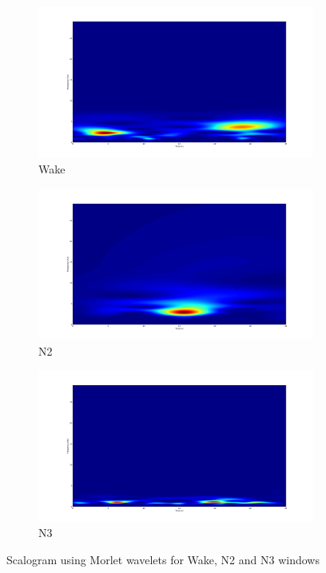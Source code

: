 \documentclass[12pt]{report}
\begin{document}
\begin{figure}[H]
\begin{subfigure}{0.3\textwidth}
	\centering
	\includegraphics[width=1\textwidth]{img/chap2/wake_wavelets.png}
	\caption{Wake}
	\label{fig:wake_wav}
\end{subfigure}
\begin{subfigure}{0.3\textwidth}
	\centering
	\includegraphics[width=1\textwidth]{img/chap2/n2_wavelets.png}
	\caption{N2}
	\label{fig:n2_wav}
\end{subfigure}
\begin{subfigure}{0.3\textwidth}
	\centering
	\includegraphics[width=1\textwidth]{img/chap2/n3_wavelets.png}
	\caption{N3}
	\label{fig:n3_wav}
\end{subfigure}

\caption{\label{fig:3winsows_wav}Scalogram using Morlet wavelets for Wake, N2 and N3 windows}
\end{figure}
\end{document}
